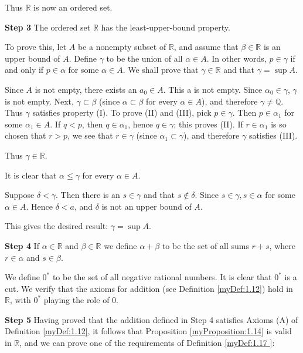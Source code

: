 Thus $\mathbb{R}$ is now an ordered set.


\textbf{Step 3}
The ordered set $\mathbb{R}$ has the least-upper-bound property.

To prove this, let $A$ be a nonempty subset of $\mathbb{R}$, and assume that $\beta \in \mathbb{R}$ is an upper bound of $A$. Define $\gamma$ to be the union of all $\alpha \in A$. In other words, $p\in \gamma$ if and only if $p \in \alpha$ for some $\alpha \in A$. We shall prove that $\gamma \in \mathbb{R}$ and that $\gamma = \sup A$.

Since $A$ is not empty, there exists an $a_0 \in A$. This a is not empty. Since $\alpha_0 \in \gamma$, $\gamma$ is not empty. Next, $\gamma \subset \beta$ (since $\alpha \subset \beta$ for every $\alpha \in A$), and therefore $\gamma \neq \mathbb{Q}$. Thus $\gamma$ satisfies property (I). To prove (II) and (III), pick $p \in \gamma$. Then $p \in \alpha_1$ for some $\alpha_1 \in A$. If $q <p$, then $q \in \alpha_1$, hence $q \in \gamma$; this proves (II). If $r \in \alpha_1$ is so chosen that $r > p$, we see that $r\in \gamma$ (since $\alpha_1 \subset \gamma$), and therefore $\gamma$
satisfies (III).

Thus $\gamma \in \mathbb{R}$.

It is clear that $\alpha \leq \gamma$ for every $\alpha \in A$.

Suppose $\delta < \gamma$. Then there is an $s \in \gamma$ and that $s \not\in \delta$. Since $s \in \gamma, s \in \alpha$
for some $\alpha \in A$. Hence $\delta <a$, and $\delta$ is not an upper bound of $A$.

This gives the desired result: $\gamma = \sup A$.


\textbf{Step 4} If $\alpha \in \mathbb{R}$ and $\beta \in \mathbb{R}$ we define $\alpha + \beta$ to be the set of all sums $r + s$, where
$r \in \alpha$ and $s \in \beta$.

We define $0^*$ to be the set of all negative rational numbers. It is clear that $0^*$ is a cut. We verify that the axioms for addition (see Definition \ref{myDef:1.12}) hold in
$\mathbb{R}$, with $0^*$ playing the role of $0$.

\textbf{Step 5} Having proved that the addition defined in Step 4 satisfies Axioms (A) of Definition \ref{myDef:1.12}, it follows that Proposition \ref{myProposition:1.14} is valid in $\mathbb{R}$, and we can
prove one of the requirements of Definition \ref{myDef:1.17
}:

